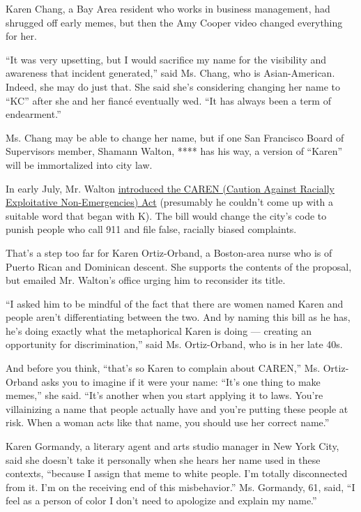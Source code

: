 Karen Chang, a Bay Area resident who works in business management, had
shrugged off early memes, but then the Amy Cooper video changed
everything for her.

``It was very upsetting, but I would sacrifice my name for the
visibility and awareness that incident generated,'' said Ms. Chang, who
is Asian-American. Indeed, she may do just that. She said she's
considering changing her name to ``KC'' after she and her fiancé
eventually wed. ``It has always been a term of endearment.''

Ms. Chang may be able to change her name, but if one San Francisco Board
of Supervisors member, Shamann Walton, **** has his way, a version of
``Karen'' will be immortalized into city law.

In early July, Mr. Walton
\href{https://www.nytimes.com/2020/07/24/briefing/caren-act-911-san-francisco.html}{introduced
the CAREN (Caution Against Racially Exploitative Non-Emergencies) Act}
(presumably he couldn't come up with a suitable word that began with K).
The bill would change the city's code to punish people who call 911 and
file false, racially biased complaints.

That's a step too far for Karen Ortiz-Orband, a Boston-area nurse who is
of Puerto Rican and Dominican descent. She supports the contents of the
proposal, but emailed Mr. Walton's office urging him to reconsider its
title.

``I asked him to be mindful of the fact that there are women named Karen
and people aren't differentiating between the two. And by naming this
bill as he has, he's doing exactly what the metaphorical Karen is doing
--- creating an opportunity for discrimination,'' said Ms. Ortiz-Orband,
who is in her late 40s.

And before you think, ``that's so Karen to complain about CAREN,'' Ms.
Ortiz-Orband asks you to imagine if it were your name: ``It's one thing
to make memes,'' she said. ``It's another when you start applying it to
laws. You're villainizing a name that people actually have and you're
putting these people at risk. When a woman acts like that name, you
should use her correct name.''

Karen Gormandy, a literary agent and arts studio manager in New York
City, said she doesn't take it personally when she hears her name used
in these contexts, ``because I assign that meme to white people. I'm
totally disconnected from it. I'm on the receiving end of this
misbehavior.'' Ms. Gormandy, 61, said, ``I feel as a person of color I
don't need to apologize and explain my name.''


